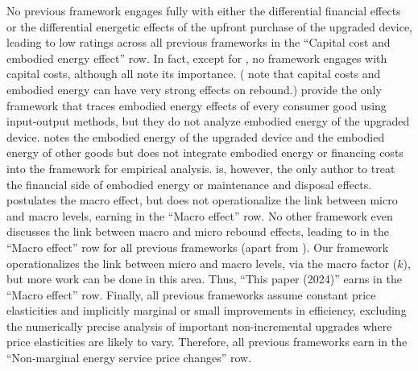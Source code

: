 \documentclass[12pt]{article}\usepackage[]{graphicx}\usepackage[]{xcolor}
\begin{document}
No previous framework engages fully with either the differential financial effects
or the differential energetic effects
of the upfront purchase of the upgraded device, 
leading to low ratings across all previous frameworks in the
``Capital cost and embodied energy effect'' row.
In fact, except for \citet{Nassen:2009aa},
no framework engages with capital costs, 
although all note its importance. 
(\citeauthor{Nassen:2009aa} note that 
capital costs and embodied energy can have very strong effects on rebound.)
\citet{Thomas:2013aa,Thomas:2013ab} provide the only framework 
that traces embodied energy effects
of every consumer good using input-output methods, but
they do not analyze embodied energy of the upgraded device.
\citet{Borenstein:2015aa} notes
the embodied energy of the upgraded device
and the embodied energy of other goods
but does not integrate embodied energy
or financing costs into the framework for empirical analysis. 
\citeauthor{Borenstein:2015aa} is, however, 
the only author to treat the financial side of 
embodied energy or maintenance and disposal effects. 
\citet{Borenstein:2015aa} postulates the macro effect, 
but does not operationalize the link between micro and macro levels, 
earning  in the ``Macro effect'' row. 
No other framework even discusses the link between macro and micro rebound effects, 
leading to  in the ``Macro effect'' row for all previous frameworks
(apart from \citet{Borenstein:2015aa}). 
Our framework operationalizes the link between micro and macro levels, 
via the macro factor ($k$), 
but more work can be done in this area.
Thus, ``This paper (2024)'' earns  in the ``Macro effect'' row.
Finally, all previous frameworks assume constant price elasticities and
implicitly marginal or small improvements in efficiency, 
excluding the numerically precise analysis of important non-incremental upgrades
where price elasticities are likely to vary. 
Therefore, all previous frameworks earn  in the 
``Non-marginal energy service price changes'' row.
\end{document}
